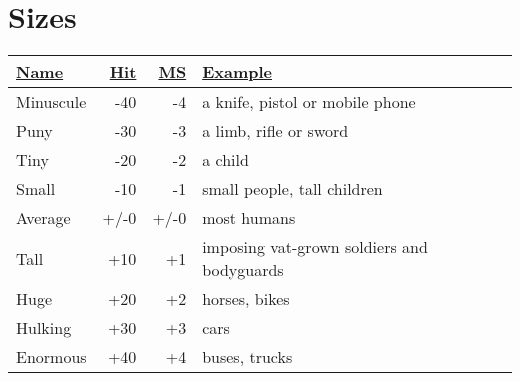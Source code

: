 \section{Sizes}
\label{sizestable}
\begin{tabularx}{\columnwidth}{|l|r|r|X|}
	\hline
	\ul{Name} & \ul{Hit} & \ul{MS} & \ul{Example} \\ \hline
	Minuscule & -40 & -4 & a knife, pistol or mobile phone \\ \hline
	Puny & -30 & -3 & a limb, rifle or sword \\ \hline
	Tiny & -20 & -2 & a child \\ \hline
	Small & -10 & -1 & small people, tall children \\ \hline
	Average & +/-0 & +/-0 & most humans \\ \hline
	Tall & +10 & +1 & imposing vat-grown soldiers and bodyguards \\ \hline
	Huge & +20 & +2 & horses, bikes \\ \hline
	Hulking & +30 & +3 & cars \\ \hline
	Enormous & +40 & +4 & buses, trucks \\ \hline
\end{tabularx}
